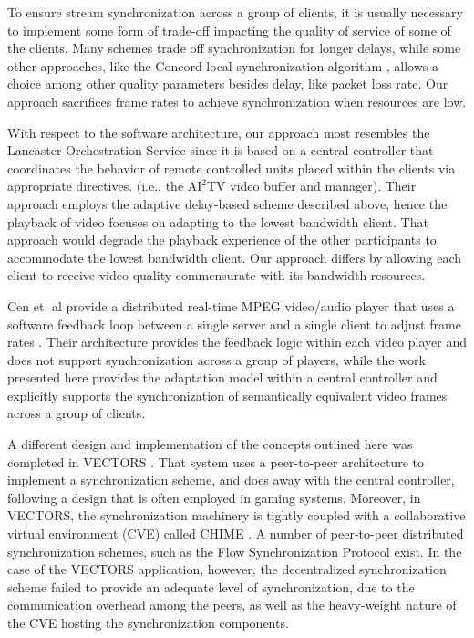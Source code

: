 \documentclass{sig-alternate}
\begin{document}
To ensure stream synchronization across a group of clients, it is
usually necessary to implement some form of trade-off impacting the
quality of service of some of the clients.  Many schemes trade off
synchronization for longer delays, while some other approaches, like
the Concord local synchronization algorithm \cite{Concord}, allows a
choice among other quality parameters besides delay, like packet loss
rate.  Our approach sacrifices frame rates to achieve synchronization
when resources are low.

With respect to the software architecture, our approach most resembles
the Lancaster Orchestration Service \cite{Lancaster} since it is based
on a central controller that coordinates the behavior of remote
controlled units placed within the clients via appropriate directives.
(i.e., the $\mathrm{AI}^2$TV video buffer and manager).  Their
approach employs the adaptive delay-based scheme described above,
hence the playback of video focuses on adapting to the lowest
bandwidth client.  That approach would degrade the playback experience
of the other participants to accommodate the lowest bandwidth client.
Our approach differs by allowing each client to receive video quality
commensurate with its bandwidth resources.

Cen et. al provide a distributed real-time MPEG video/audio player
that uses a software feedback loop between a single server and a
single client to adjust frame rates \cite{CEN}.  Their architecture
provides the feedback logic within each video player and does not
support synchronization across a group of players, while the work
presented here provides the adaptation model within a central
controller and explicitly supports the synchronization of semantically
equivalent video frames across a group of clients.

A different design and implementation of the concepts outlined here
was completed in VECTORS \cite{VECTORS}.  That system uses a
peer-to-peer architecture to implement a synchronization scheme, and
does away with the central controller, following a design that is
often employed in gaming systems.  Moreover, in VECTORS, the
synchronization machinery is tightly coupled with a collaborative
virtual environment (CVE) called CHIME \cite{CHIME}.  A number of
peer-to-peer distributed synchronization schemes, such as the Flow
Synchronization Protocol \cite{FSP} exist.  In the case of the VECTORS
application, however, the decentralized synchronization scheme failed
to provide an adequate level of synchronization, due to the
communication overhead among the peers, as well as the heavy-weight
nature of the CVE hosting the synchronization components.
\end{document}
